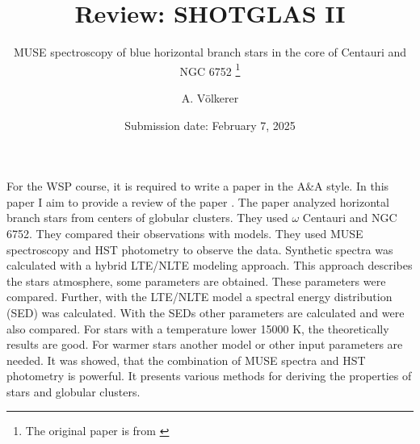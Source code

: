 \documentclass{aa}
\begin{document}
   \title{Review: SHOTGLAS II}

   \subtitle{MUSE spectroscopy of blue horizontal branch stars in the core of Centauri and NGC 6752 \thanks{The original paper is from \citep{2023A&A...677A..86L}}}

   \author{A. V\"olkerer
        }


   \date{Submission date: February 7, 2025}

 
  \abstract
   {For the WSP course, it is required to write a paper in the A\&A style. }
   {In this paper I aim to provide a review of the paper \cite{2023A&A...677A..86L}. The paper \cite{2023A&A...677A..86L} analyzed horizontal branch stars from centers of globular clusters. They used $\omega$ Centauri and NGC 6752. They compared their observations with models.}
   {They used MUSE spectroscopy and HST photometry to observe the data. Synthetic spectra was calculated with a hybrid LTE/NLTE modeling approach. This approach describes the stars atmosphere, some parameters are obtained. These parameters were compared. Further, with the LTE/NLTE model a spectral energy distribution (SED) was calculated. With the SEDs other parameters are calculated and were also compared.}
   {For stars with a temperature lower 15000 K, the theoretically results are good. For warmer stars another model or other input parameters are needed. }
   {It was showed, that the combination of MUSE spectra and HST photometry is powerful. It presents various methods for deriving the properties of stars and globular clusters.}


   \maketitle
\end{document}
